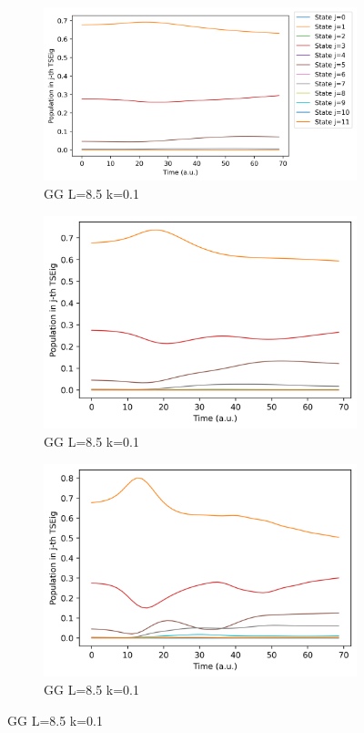 \documentclass[11pt, a4paper]{article} %
\begin{document}
\begin{figure}[h!]
  \begin{subfigure}[b]{0.36\linewidth}
    \includegraphics[width=\linewidth]{Population_GG_L8.5_k0_0.1.png}
    \caption{GG L=8.5 k=0.1}
  \end{subfigure}
    \begin{subfigure}[b]{0.30\linewidth}
    \includegraphics[width=\linewidth]{Population_GG_L8.5_k0_0.5.png}
    \caption{GG L=8.5 k=0.1}
  \end{subfigure}  
  \begin{subfigure}[b]{0.30\linewidth}
    \includegraphics[width=\linewidth]{Population_GG_L8.5_k0_1.0.png}
    \caption{GG L=8.5 k=0.1}
  \end{subfigure}
  

\end{figure}
\end{document}
